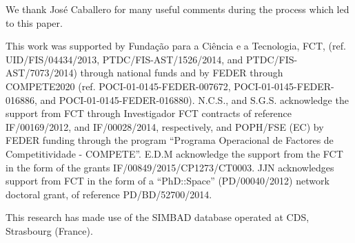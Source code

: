 \documentclass{aa}
\begin{document}
\begin{acknowledgements}

We thank Jos\'e Caballero for many useful comments during the process which led to this paper.

This work was supported by Funda\c{c}\~ao para a Ci\^encia e a Tecnologia, FCT, (ref.
UID/FIS/04434/2013, PTDC/FIS-AST/1526/2014, and PTDC/FIS-AST/7073/2014) through national funds and
by FEDER through COMPETE2020 (ref. POCI-01-0145-FEDER-007672, POCI-01-0145-FEDER-016886, and
POCI-01-0145-FEDER-016880). N.C.S., and S.G.S. acknowledge the support from FCT through Investigador
FCT contracts of reference IF/00169/2012, and IF/00028/2014, respectively, and POPH/FSE (EC) by
FEDER funding through the program “Programa Operacional de Factores de Competitividade - COMPETE”.
E.D.M acknowledge the support from the FCT in the form of the grants IF/00849/2015/CP1273/CT0003.
JJN acknowledges support from FCT in the form of a “PhD::Space” (PD/00040/2012) network doctoral
grant, of reference PD/BD/52700/2014.

This research has made use of the SIMBAD database operated at CDS, Strasbourg (France).

\end{acknowledgements}




\end{document}
